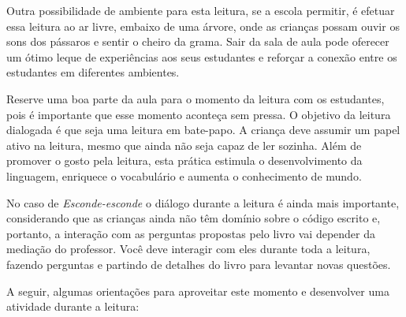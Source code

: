 \documentclass[11pt]{extarticle}
\begin{document}
Outra possibilidade de ambiente para esta leitura, se a escola permitir, 
é efetuar essa leitura ao ar livre, embaixo de uma árvore, onde as crianças 
possam ouvir os sons dos pássaros e sentir o cheiro da grama. Sair da sala 
de aula pode oferecer um ótimo leque de experiências aos seus estudantes e 
reforçar a conexão entre os estudantes em diferentes ambientes.  

Reserve uma boa parte da aula para o momento da leitura com os estudantes, 
pois é importante que esse momento aconteça sem pressa. O objetivo da 
leitura dialogada é que seja uma leitura em bate-papo. A criança deve 
assumir um papel ativo na leitura, mesmo que ainda não seja capaz de 
ler sozinha. Além de promover o gosto pela leitura, esta prática estimula 
o desenvolvimento da linguagem, enriquece o vocabulário e 
aumenta o conhecimento de mundo.

No caso de \textit{Esconde-esconde} o diálogo durante a leitura é 
ainda mais importante, considerando que as crianças ainda não têm domínio sobre o código escrito e, portanto, a interação com as perguntas propostas pelo livro vai depender da mediação do professor. 
Você deve interagir com eles durante toda a 
leitura, fazendo perguntas e partindo de detalhes do livro para 
levantar novas questões. 

A seguir, algumas orientações para aproveitar este momento e desenvolver uma atividade durante a leitura: 
\end{document}
